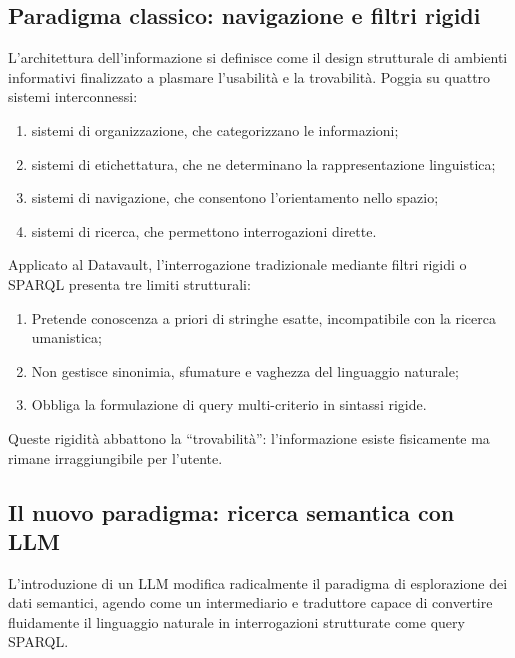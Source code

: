 \documentclass[12pt,a4paper,oneside]{book}
\begin{document}
    \subsection{Paradigma classico: navigazione e filtri rigidi}\label{subsec:paradigma_classico}

    L'architettura dell'informazione si definisce come il design strutturale di ambienti informativi finalizzato a plasmare l'usabilità e la trovabilità\cite{Mor08}. Poggia su quattro sistemi interconnessi:

    \begin{enumerate}[label={(\roman*)}]
        \item sistemi di organizzazione, che categorizzano le informazioni;
        \item sistemi di etichettatura, che ne determinano la rappresentazione linguistica;
        \item sistemi di navigazione, che consentono l'orientamento nello spazio;
        \item sistemi di ricerca, che permettono interrogazioni dirette.
    \end{enumerate}

    Applicato al Datavault, l'interrogazione tradizionale mediante filtri rigidi o SPARQL presenta tre limiti strutturali:

    \begin{enumerate}
        \item Pretende conoscenza a priori di stringhe esatte, incompatibile con la ricerca umanistica\hfill\cite{Vas24};
        \item Non gestisce sinonimia, sfumature e vaghezza del linguaggio naturale;
        \item Obbliga la formulazione di query multi-criterio in sintassi rigide.
    \end{enumerate}

    Queste rigidità abbattono la ``trovabilità'': l'informazione esiste fisicamente ma rimane irraggiungibile per l'utente.

    \subsection{Il nuovo paradigma: ricerca semantica con LLM}\label{subsec:paradigma_semantico}

    L'introduzione di un LLM modifica radicalmente il paradigma di esplorazione dei dati semantici, agendo come un intermediario e traduttore capace di convertire fluidamente il linguaggio naturale in interrogazioni strutturate come query SPARQL.\@
\end{document}
